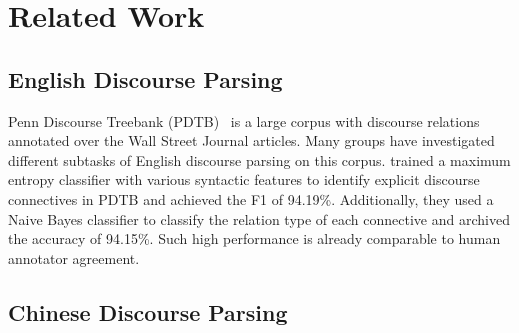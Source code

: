 %
%
%
\chapter{Related Work}
\label{c:related}


\section{English Discourse Parsing}

Penn Discourse Treebank (PDTB)~\citep{Prasad08thepenn} is a large
corpus with discourse relations annotated over the Wall Street Journal
articles. Many groups have investigated different subtasks of English
discourse parsing on this corpus. \cite{pitler2009using} trained a maximum
entropy classifier with various syntactic features to identify explicit discourse
connectives in PDTB and achieved the F1 of 94.19\%. Additionally, they used
a Naive Bayes classifier to classify the relation type of each connective and
archived the accuracy of 94.15\%. Such high performance is already
comparable to human annotator agreement.

\section{Chinese Discourse Parsing}
